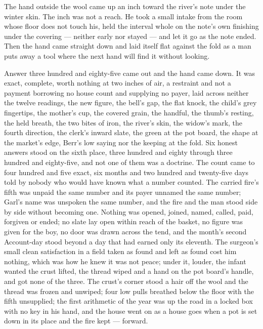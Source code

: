 The hand outside the wool came up an inch toward the river's note under the winter skin. The inch was not a reach. He took a small intake from the room whose floor does not touch his, held the interval whole on the note's own finishing under the covering --- neither early nor stayed --- and let it go as the note ended. Then the hand came straight down and laid itself flat against the fold as a man puts away a tool where the next hand will find it without looking.

Answer three hundred and eighty-five came out and the hand came down. It was exact, complete, worth nothing at two inches of air, a restraint and not a payment borrowing no house count and supplying no payer, laid across neither the twelve readings, the new figure, the bell's gap, the flat knock, the child's grey fingertips, the mother's cup, the covered grain, the handful, the thumb's resting, the held breath, the two bites of iron, the river's skin, the widow's mark, the fourth direction, the clerk's inward slate, the green at the pot board, the shape at the market's edge, Berr's low saying nor the keeping at the fold. Six honest answers stood on the sixth place, three hundred and eighty through three hundred and eighty-five, and not one of them was a doctrine. The count came to four hundred and five exact, six months and two hundred and twenty-five days told by nobody who would have known what a number counted. The carried fire's fifth was unpaid the same number and its payer unnamed the same number; Garl's name was unspoken the same number, and the fire and the man stood side by side without becoming one. Nothing was opened, joined, named, called, paid, forgiven or ended; no slate lay open within reach of the basket, no figure was given for the boy, no door was drawn across the tend, and the month's second Account-day stood beyond a day that had earned only its eleventh. The surgeon's small clean satisfaction in a field taken as found and left as found cost him nothing, which was how he knew it was not peace; under it, louder, the infant wanted the crust lifted, the thread wiped and a hand on the pot board's handle, and got none of the three. The crust's corner stood a hair off the wool and the thread was frozen and unwiped; four low pulls breathed below the floor with the fifth unsupplied; the first arithmetic of the year was up the road in a locked box with no key in his hand, and the house went on as a house goes when a pot is set down in its place and the fire kept --- forward.
